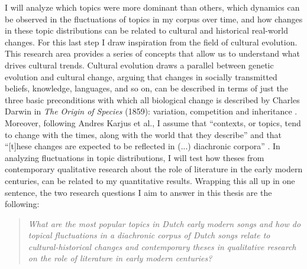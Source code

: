 I will analyze which topics were more dominant than others, which dynamics can be observed in the fluctuations of topics in my corpus over time, and how changes in these topic distributions can be related to cultural and historical real-world changes. For this last step I draw inspiration from the field of cultural evolution. This research area provides a series of concepts that allow us to understand what drives cultural trends. Cultural evolution draws a parallel between genetic evolution and cultural change, arguing that changes in socially transmitted beliefs, knowledge, languages, and so on, can be described in terms of just the three basic preconditions with which all biological change is described by Charles Darwin in \textit{The Origin of Species} (1859): variation, competition and inheritance \autocite[26]{mesoudi_cultural_2011}. Moreover, following Andres Karjus et al., I assume that \enquote{contexts, or topics, tend to change with the times, along with the world that they describe} and that \enquote{[t]hese changes are expected to be reflected in (...) diachronic corpora} \autocite[1]{karjus_quantifying_2018}. In analyzing fluctuations in topic distributions, I will test how theses from contemporary qualitative research about the role of literature in the early modern centuries, can be related to my quantitative results. Wrapping this all up in one sentence, the two research questions I aim to answer in this thesis are the following:

\begin{quote}
	\textit{What are the most popular topics in Dutch early modern songs and how do topical fluctuations in a diachronic corpus of Dutch songs relate to cultural-historical changes and contemporary theses in qualitative research on the role of literature in early modern centuries?}
\end{quote} 


